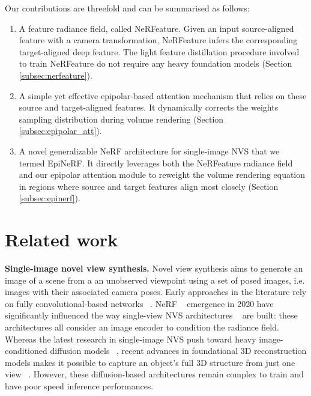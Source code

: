 Our contributions are threefold and can be summarised as follows: 
\begin{enumerate}
   \item A  feature radiance field, called NeRFeature. Given an input source-aligned feature with a camera transformation, NeRFeature infers the corresponding target-aligned deep feature. The light feature distillation procedure involved to train NeRFeature do not require any heavy foundation models (Section \ref{subsec:nerfeature}). 
    \item A simple yet effective epipolar-based attention mechanism that relies on these source and target-aligned features. It dynamically corrects the weights sampling distribution during volume rendering (Section \ref{subsec:epipolar_att}). 
    \item A novel generalizable NeRF architecture for single-image NVS that we termed EpiNeRF. It directly leverages both the NeRFeature radiance field and our epipolar attention module to reweight the volume rendering equation in regions where source and target features align most closely (Section \ref{subsec:epinerf}).  
    
\end{enumerate}


\section{Related work}

\noindent\textbf{Single-image novel view synthesis.} Novel view synthesis aims to generate an image of a scene from a an unobserved viewpoint using a set of posed images, i.e. images with their associated camera poses. Early approaches in the literature rely on fully convolutional-based networks ~\cite{kim2020novel,hou2021novel,guo2022fast,landreau2022epipolarnvs}. NeRF ~\cite{mildenhall2020nerf} emergence in 2020  have significantly influenced the way single-view NVS architectures ~\cite{yu2021pixelnerf,li2022symmnerf,lin2023vision} are built: these architectures all consider an image encoder to condition the radiance field. Whereas the latest research in single-image NVS push toward heavy image-conditioned diffusion models ~\cite{chen2023single,gu2023nerfdiff,chan2023genvs}, recent advances in foundational 3D reconstruction models makes it possible to capture an object's full 3D structure from just one view ~\cite{liu2023zero,zou2023triplane}. However, these diffusion-based architectures remain complex to train and have poor speed inference performances.  

